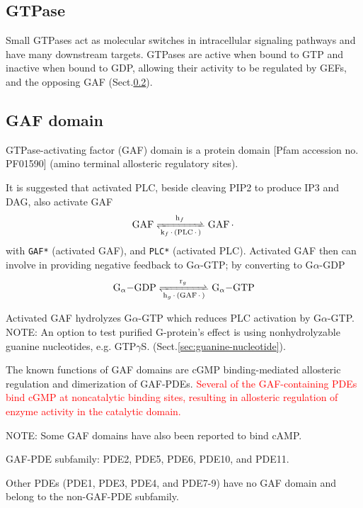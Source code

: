 \subsection{GTPase}
\label{sec:GTPase}

Small GTPases act as molecular switches in intracellular signaling pathways and
have many downstream targets.
GTPases are active when bound to GTP and inactive when bound to GDP, allowing
their activity to be regulated by GEFs, and the opposing GAF
(Sect.\ref{sec:GAF-domain}).

\subsection{GAF domain}
\label{sec:GAF-domain}
\label{sec:GTPase-activating-factor}

GTPase-activating factor (GAF) domain is a protein domain [Pfam accession no.
PF01590] (amino terminal allosteric regulatory sites).

It is suggested that activated PLC, beside cleaving PIP2 to produce IP3 and DAG,
also activate GAF
\begin{equation}
\ce{GAF <=>[h_f][k_f.(PLC*)] GAF*}
\end{equation}
with \verb!GAF*! (activated GAF), and \verb!PLC*! (activated PLC). Activated GAF
then can involve in providing negative feedback to G$\alpha$-GTP; by converting
to G$\alpha$-GDP
\begin{equation}
\ce{G_\alpha-GDP <=>[r_g][h_g.(GAF*)] G_\alpha-GTP}
\end{equation}

Activated GAF hydrolyzes G$\alpha$-GTP which reduces PLC activation by
G$\alpha$-GTP. NOTE: An option to test purified G-protein's effect is using
nonhydrolyzable guanine nucleotides, e.g. GTP$\gamma$S.
(Sect.\ref{sec:guanine-nucleotide}).

The known functions of GAF domains are cGMP binding-mediated allosteric
regulation and dimerization of GAF-PDEs. \textcolor{red}{Several of the
GAF-containing PDEs bind cGMP at noncatalytic binding sites, resulting in
allosteric regulation of enzyme activity in the catalytic domain.}

NOTE: Some GAF domains have also been reported to bind cAMP.

GAF-PDE subfamily: PDE2, PDE5, PDE6, PDE10, and PDE11.

Other PDEs (PDE1, PDE3, PDE4, and PDE7-9) have no GAF domain and belong to the
non-GAF-PDE subfamily.


